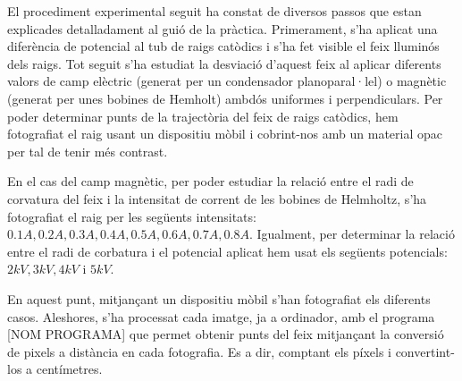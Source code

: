 \documentclass[11pt]{article}
\numberwithin{equation}{section}
\numberwithin{figure}{section}
\numberwithin{table}{section}
\begin{document}
El procediment experimental seguit ha constat de diversos passos que estan explicades detalladament al guió de la pràctica. 
Primerament, s'ha aplicat una diferència de potencial al tub de raigs catòdics i s'ha fet visible el feix lluminós dels raigs. Tot seguit s'ha estudiat la desviació d'aquest feix al aplicar diferents valors de camp elèctric (generat per un condensador planoparal·lel) o magnètic (generat per unes bobines de Hemholt) ambdós uniformes i perpendiculars. Per poder determinar punts de la trajectòria del feix de raigs catòdics, hem fotografiat el raig usant un dispositiu mòbil i cobrint-nos amb un material opac per tal de tenir més contrast.

En el cas del camp magnètic, per poder estudiar la relació entre el radi de corvatura del feix i la intensitat de corrent de les bobines de Helmholtz, s'ha fotografiat el raig per les següents intensitats:  $0.1A, 0.2A, 0.3A, 0.4A, 0.5A, 0.6A, 0.7A, 0.8A$. Igualment, per determinar la relació entre el radi de corbatura i el potencial aplicat hem usat els següents potencials: $2kV, 3kV, 4kV$ i $5kV$.

En aquest punt, mitjançant un dispositiu mòbil s'han fotografiat els diferents casos. Aleshores, s'ha processat cada imatge, ja a ordinador, amb el programa [NOM PROGRAMA] que permet obtenir punts del feix mitjançant la conversió de pixels a distància en cada fotografia. Es a dir, comptant els píxels i convertint-los a centímetres. 



\end{document}
